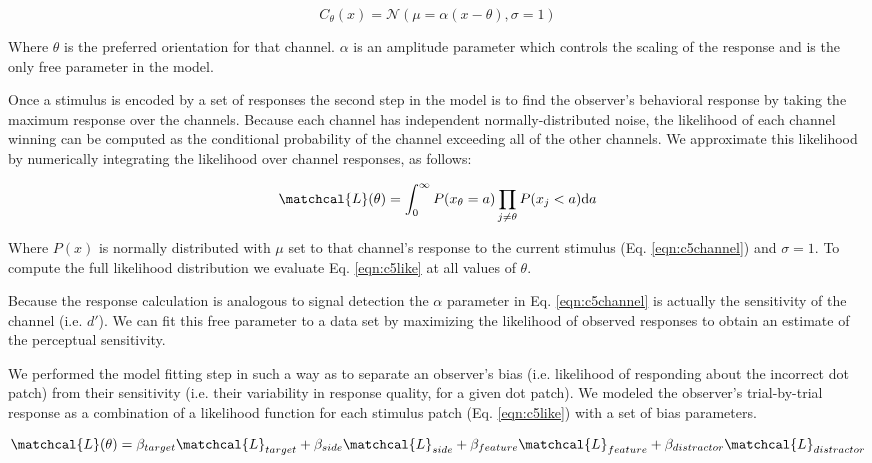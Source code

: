 \begin{equation}
    C_{\theta}(x) = \mathcal{N}(\mu = \alpha(x-\theta),\sigma=1)
    \label{eqn:c5channel}
\end{equation}

Where $\theta$ is the preferred orientation for that channel. $\alpha$ is an amplitude parameter which controls the scaling of the response and is the only free parameter in the model.

Once a stimulus is encoded by a set of responses the second step in the model is to find the observer's behavioral response by taking the maximum response over the channels. Because each channel has independent normally-distributed noise, the likelihood of each channel winning can be computed as the conditional probability of the channel exceeding all of the other channels. We approximate this likelihood by numerically integrating the likelihood over channel responses, as follows:

\begin{equation}
    \matchcal{L}(\theta) = \int_{0}^{\infty} P(x_{\theta}=a) \prod_{j\neq \theta}P(x_j < a) \mathrm{d}a
    \label{eqn:c5like}
\end{equation}

Where $P(x)$ is normally distributed with $\mu$ set to that channel's response to the current stimulus (Eq. \ref{eqn:c5channel}) and $\sigma=1$. To compute the full likelihood distribution we evaluate Eq. \ref{eqn:c5like} at all values of $\theta$.

Because the response calculation is analogous to signal detection the $\alpha$ parameter in Eq. \ref{eqn:c5channel} is actually the sensitivity of the channel (i.e. $d'$). We can fit this free parameter to a data set by maximizing the likelihood of observed responses to obtain an estimate of the perceptual sensitivity.

We performed the model fitting step in such a way as to separate an observer's bias (i.e. likelihood of responding about the incorrect dot patch) from their sensitivity (i.e. their variability in response quality, for a given dot patch). We modeled the observer's trial-by-trial response as a combination of a likelihood function for each stimulus patch (Eq. \ref{eqn:c5like}) with a set of bias parameters.

\begin{equation}
    \matchcal{L}(\theta) = \beta_{target}\matchcal{L}_{target} + \beta_{side}\matchcal{L}_{side} +\beta_{feature}\matchcal{L}_{feature} +\beta_{distractor}\matchcal{L}_{distractor}
\end{equation}

